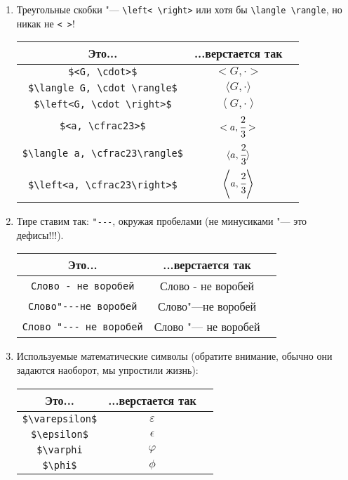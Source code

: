 \begin{enumerate}
\begin{enumerate}
	\item 
		Треугольные скобки "--- \verb'\left< \right>' или хотя бы \verb'\langle \rangle', но никак не \verb'< >'!
		\begin{center}\begin{tabular}{|c|c|c|}
			\hline Это... & ...верстается так & \\
			\hline \verb'$<G, \cdot>$' & $<G, \cdot>$ \bad \\
			\hline \verb'$\langle G, \cdot \rangle$' & $\langle G, \cdot \rangle$ \ok \\
			\hline \verb'$\left<G, \cdot \right>$' & $\left<G, \cdot \right>$ \ok \\
			\hline \verb'$<a, \cfrac23>$' & $<a, \cfrac23>$ \bad \\
			\hline \verb'$\langle a, \cfrac23\rangle$' & $\langle a, \cfrac23\rangle$ \bad \\
			\hline \verb'$\left<a, \cfrac23\right>$' & $\left<a, \cfrac23\right>$ \ok \\
			\hline
		\end{tabular}\end{center}
	
	\item 
		Тире ставим так: \verb'"---', окружая пробелами (не минусиками "--- это дефисы!!!).
		\begin{center}\begin{tabular}{|c|c|c|}
			\hline Это... & ...верстается так & \\
			\hline \verb'Слово - не воробей' & Слово - не воробей \bad \\
			\hline \verb'Слово"---не воробей' & Слово"---не воробей \bad \\
			\hline \verb'Слово "--- не воробей' & Слово "--- не воробей \ok \\
			\hline
		\end{tabular}\end{center}

	\item
		Используемые математические символы (обратите внимание, обычно они задаются наоборот, мы упростили жизнь):
		\begin{center}\begin{tabular}{|c|c|c|}
			\hline Это... & ...верстается так & \\
			\hline \verb'$\varepsilon$' & $\varepsilon$ \bad \\
			\hline \verb'$\epsilon$' & $\epsilon$ \ok \\
			\hline \verb'$\varphi' & $\varphi$ \bad \\
			\hline \verb'$\phi$' & $\phi$ \ok \\
			\hline
		\end{tabular}\end{center}


\end{enumerate}
\end{enumerate}
